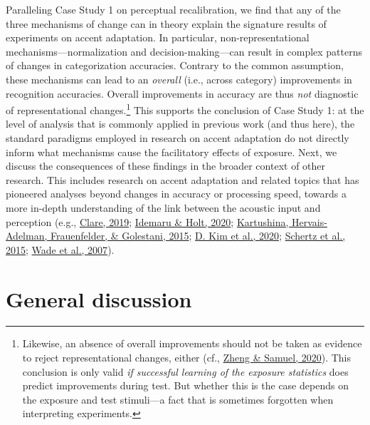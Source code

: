 \documentclass[
  11pt,
  english,
  man,floatsintext]{apa6}
\begin{document}
Paralleling Case Study 1 on perceptual recalibration, we find that any of the three mechanisms of change can in theory explain the signature results of experiments on accent adaptation. In particular, non-representational mechanisms---normalization and decision-making---can result in complex patterns of changes in categorization accuracies. Contrary to the common assumption, these mechanisms can lead to an \emph{overall} (i.e., across category) improvements in recognition accuracies. Overall improvements in accuracy are thus \emph{not} diagnostic of representational changes.\footnote{Likewise, an absence of overall improvements should not be taken as evidence to reject representational changes, either (cf., \protect\hyperlink{ref-zheng-samuel2020}{Zheng \& Samuel, 2020}). This conclusion is only valid \emph{if successful learning of the exposure statistics} does predict improvements during test. But whether this is the case depends on the exposure and test stimuli---a fact that is sometimes forgotten when interpreting experiments.} This supports the conclusion of Case Study 1: at the level of analysis that is commonly applied in previous work (and thus here), the standard paradigms employed in research on accent adaptation do not directly inform what mechanisms cause the facilitatory effects of exposure. Next, we discuss the consequences of these findings in the broader context of other research. This includes research on accent adaptation and related topics that has pioneered analyses beyond changes in accuracy or processing speed, towards a more in-depth understanding of the link between the acoustic input and perception (e.g., \protect\hyperlink{ref-clare2019}{Clare, 2019}; \protect\hyperlink{ref-idemaru-holt2020}{Idemaru \& Holt, 2020}; \protect\hyperlink{ref-kartushina2015}{Kartushina, Hervais-Adelman, Frauenfelder, \& Golestani, 2015}; \protect\hyperlink{ref-kim2020}{D. Kim et al., 2020}; \protect\hyperlink{ref-schertz2015}{Schertz et al., 2015}; \protect\hyperlink{ref-wade2007}{Wade et al., 2007}).

\hypertarget{general-discussion}{%
\section{General discussion}\label{general-discussion}}
\end{document}
